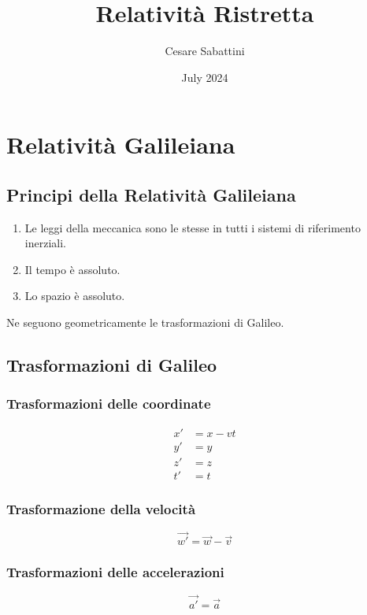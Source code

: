\documentclass{article}
\title{
    Relatività Ristretta
}
\author{Cesare Sabattini}
\date{July 2024}
\begin{document}
\maketitle

\section{
 Relatività Galileiana
}

\subsection{Principi della Relatività Galileiana}

\begin{enumerate}
    \item Le leggi della meccanica sono le stesse in tutti i sistemi di riferimento inerziali.
    \item Il tempo è assoluto.
    \item Lo spazio è assoluto.
\end{enumerate}

Ne seguono geometricamente le trasformazioni di Galileo.

\subsection{Trasformazioni di Galileo}

\subsubsection{
Trasformazioni delle coordinate
}
\begin{equation}
\begin{aligned}
    x' &= x - vt \\
    y' &= y \\
    z' &= z \\
    t' &= t
\end{aligned}
\end{equation}

\subsubsection{
Trasformazione della velocità
}
\begin{equation}
    \vec{w'} = \vec{w} - \vec{v}
\end{equation}

\subsubsection{
    Trasformazioni delle accelerazioni
}
\begin{equation}
    \vec{a'} = \vec{a}
\end{equation}
\end{document}
